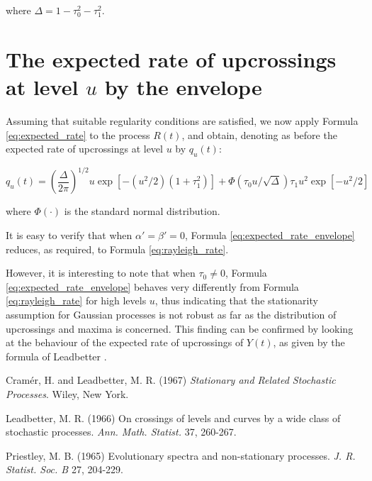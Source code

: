\documentclass{article}
\begin{document}
where $\Delta = 1 - \tau_0^2 - \tau_1^2$.

\section{The expected rate of upcrossings at level $u$ by the envelope}
Assuming that suitable regularity conditions are satisfied, we now apply Formula \ref{eq:expected_rate} to the process $R(t)$, and obtain, denoting as before the expected rate of upcrossings at level $u$ by $q_u(t)$:

\begin{equation}
\label{eq:expected_rate_envelope}
q_u(t) = \left(\frac{\Delta}{2\pi}\right)^{1/2} u \exp\left[-(u^2/2)(1+\tau_1^2)\right]
+\Phi(\tau_0 u/\sqrt{\Delta}) \tau_1 u^2 \exp[-u^2/2]
\end{equation}

where $\Phi(\cdot)$ is the standard normal distribution.

It is easy to verify that when $\alpha' = \beta' = 0$, Formula \ref{eq:expected_rate_envelope} reduces, as required, to Formula \ref{eq:rayleigh_rate}.

However, it is interesting to note that when $\tau_0 \neq 0$, Formula \ref{eq:expected_rate_envelope} behaves very differently from Formula \ref{eq:rayleigh_rate} for high levels $u$, thus indicating that the stationarity assumption for Gaussian processes is not robust as far as the distribution of upcrossings and maxima is concerned. This finding can be confirmed by looking at the behaviour of the expected rate of upcrossings of $Y(t)$, as given by the formula of Leadbetter \cite{leadbetter1966}.

\begin{thebibliography}{3}
 Cramér, H. and Leadbetter, M. R. (1967) \textit{Stationary and Related Stochastic Processes}. Wiley, New York.

 Leadbetter, M. R. (1966) On crossings of levels and curves by a wide class of stochastic processes. \textit{Ann. Math. Statist.} 37, 260-267.

 Priestley, M. B. (1965) Evolutionary spectra and non-stationary processes. \textit{J. R. Statist. Soc. B} 27, 204-229.
\end{thebibliography}
\end{document}
